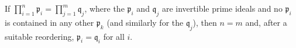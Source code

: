 If $\prod_{i=1}^n \mathfrak{p}_i = \prod_{j=1}^m \mathfrak{q}_j$, where the $\mathfrak{p}_i$ and $\mathfrak{q}_j$ are invertible prime ideals and no $\mathfrak{p}_i$ is contained in any other $\mathfrak{p}_k$ (and similarly for the $\mathfrak{q}_j$), then $n = m$ and, after a suitable reordering, $\mathfrak{p}_i = \mathfrak{q}_i$ for all $i$.
